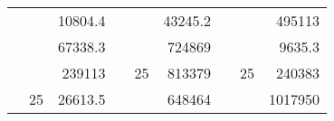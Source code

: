 \begin{table}[H]
\begin{tabular}{|ccrccrccc}
\rowcolor[HTML]{DAE8FC} 
\multicolumn{1}{|c|}{\cellcolor[HTML]{FFFFC7}}                                & \multicolumn{1}{c|}{\cellcolor[HTML]{DAE8FC}}                      & \multicolumn{1}{r|}{\cellcolor[HTML]{DAE8FC}10804.4}   & \multicolumn{1}{c|}{\cellcolor[HTML]{FFFFC7}}                                & \multicolumn{1}{c|}{\cellcolor[HTML]{DAE8FC}}                       & \multicolumn{1}{r|}{\cellcolor[HTML]{DAE8FC}43245.2}   & \multicolumn{1}{c|}{\cellcolor[HTML]{FFFFC7}}                                & \multicolumn{1}{c|}{\cellcolor[HTML]{DAE8FC}}                      & \multicolumn{1}{r|}{\cellcolor[HTML]{DAE8FC}495113}    \\ \cline{3-3} \cline{6-6} \cline{9-9} 
\multicolumn{1}{|c|}{\cellcolor[HTML]{FFFFC7}}                                & \multicolumn{1}{c|}{\cellcolor[HTML]{DAE8FC}}                      & \multicolumn{1}{r|}{\cellcolor[HTML]{DDFDFF}67338.3}   & \multicolumn{1}{c|}{\cellcolor[HTML]{FFFFC7}}                                & \multicolumn{1}{c|}{\cellcolor[HTML]{DAE8FC}}                       & \multicolumn{1}{r|}{\cellcolor[HTML]{DDFDFF}724869}    & \multicolumn{1}{c|}{\cellcolor[HTML]{FFFFC7}}                                & \multicolumn{1}{c|}{\cellcolor[HTML]{DAE8FC}}                      & \multicolumn{1}{r|}{\cellcolor[HTML]{DDFDFF}9635.3}    \\ \cline{3-3} \cline{6-6} \cline{9-9} 
\rowcolor[HTML]{DAE8FC} 
\multicolumn{1}{|c|}{\cellcolor[HTML]{FFFFC7}}                                & \multicolumn{1}{c|}{\cellcolor[HTML]{DAE8FC}}                      & \multicolumn{1}{r|}{\cellcolor[HTML]{DAE8FC}239113}    & \multicolumn{1}{c|}{\cellcolor[HTML]{FFFFC7}}                                & \multicolumn{1}{c|}{\multirow{-9}{*}{\cellcolor[HTML]{DAE8FC}25}}   & \multicolumn{1}{r|}{\cellcolor[HTML]{DAE8FC}813379}    & \multicolumn{1}{c|}{\cellcolor[HTML]{FFFFC7}}                                & \multicolumn{1}{c|}{\multirow{-9}{*}{\cellcolor[HTML]{DAE8FC}25}}  & \multicolumn{1}{r|}{\cellcolor[HTML]{DAE8FC}240383}    \\ \cline{3-3} \cline{5-6} \cline{8-9} 
\multicolumn{1}{|c|}{\cellcolor[HTML]{FFFFC7}}                                & \multicolumn{1}{c|}{\multirow{-10}{*}{\cellcolor[HTML]{DAE8FC}25}} & \multicolumn{1}{r|}{\cellcolor[HTML]{DDFDFF}26613.5}   & \multicolumn{1}{c|}{\cellcolor[HTML]{FFFFC7}}                                & \multicolumn{1}{c|}{\cellcolor[HTML]{DDFDFF}}                       & \multicolumn{1}{r|}{\cellcolor[HTML]{DAE8FC}648464}    & \multicolumn{1}{c|}{\cellcolor[HTML]{FFFFC7}}                                & \multicolumn{1}{c|}{\cellcolor[HTML]{DDFDFF}}                      & \multicolumn{1}{r|}{\cellcolor[HTML]{DAE8FC}1017950}   \\ \cline{2-3} \cline{6-6} \cline{9-9} 

\end{tabular}
\end{table}
